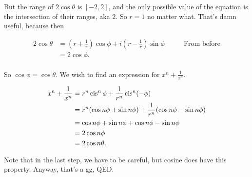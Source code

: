 \documentclass[../key.tex]{subfiles}
\begin{document}
But the range of $2\cos\theta$ is $[-2,2]$, and the only possible value of the equation is the intersection of their ranges, aka $2$. So $r=1$ no matter what. That's damn useful, because then 

\begin{align*}
    2\cos \theta &= \left(r+\frac{1}{r}\right)\cos\phi + i\left(r - \frac{1}{r}\right)\sin\phi \qquad & \text{From before} \\
    &= 2\cos\phi. \\
\end{align*}

So $\cos\phi = \cos\theta$. We wish to find an expression for $x^n+\frac{1}{x^n}$.

\begin{align*}
    x^n+\frac{1}{x^n} &= r^n\operatorname{cis}^n\phi + \frac{1}{r^n}\operatorname{cis}^n(-\phi) \\
    &= r^n(\cos n\phi + \sin n\phi) + \frac{1}{r^n}(\cos n\phi - \sin n\phi) \\
    &= \cos n\phi + \sin n\phi + \cos n\phi - \sin n\phi \\
    &= 2\cos n\phi \\
    &= 2\cos n\theta. \\
\end{align*}

Note that in the last step, we have to be careful, but cosine does have this property. Anyway, that's a gg, QED.
\end{document}
